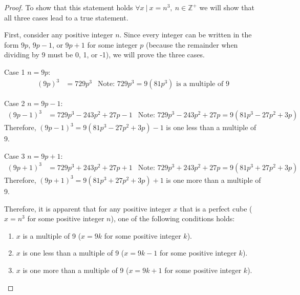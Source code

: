 \documentclass{report}
\begin{document}
\bigbreak \noindent 
\begin{proof}
    To show that this statement holds \(\forall x\ |\ x = n^{3},\ n \in \mathbb{Z}^{+}\) we will show that all three cases lead to a true statement. 
    \bigbreak \noindent 

    First, consider any positive integer \(n\). Since every integer can be written in the form \(9p\), \(9p-1\), or \(9p+1\) for some integer \(p\) (because the remainder when dividing by 9 must be 0, 1, or -1), we will prove the three cases.
    \bigbreak \noindent 

    Case 1 \(n=9p\):
    \begin{align*}
        (9p)^{3}  &= 729p^{3} & \text{Note: } 729p^3 = 9(81p^3) \text{ is a multiple of 9}
    \end{align*}
    \bigbreak \noindent 

    Case 2 \(n=9p-1\):
    \begin{align*}
        (9p-1)^{3}  &= 729p^{3}-243p^{2}+27p-1 & \text{Note: } 729p^3-243p^{2}+27p = 9(81p^3-27p^2+3p)
    \end{align*}
    Therefore, \((9p-1)^{3} = 9(81p^3-27p^2+3p)-1\) is one less than a multiple of 9.
    \bigbreak \noindent  

    Case 3 \(n=9p+1\):
    \begin{align*}
        (9p+1)^{3}  &= 729p^{3}+243p^{2}+27p+1 & \text{Note: } 729p^3+243p^{2}+27p = 9(81p^3+27p^2+3p)
    \end{align*}
    Therefore, \((9p+1)^{3} = 9(81p^3+27p^2+3p)+1\) is one more than a multiple of 9.
    \bigbreak \noindent 

    Therefore, it is apparent that for any positive integer \(x\) that is a perfect cube (\(x = n^3\) for some positive integer \(n\)), one of the following conditions holds:
    \begin{enumerate}
        \item \(x\) is a multiple of 9 (\(x = 9k\) for some positive integer \(k\)).
        \item \(x\) is one less than a multiple of 9 (\(x = 9k - 1\) for some positive integer \(k\)).
        \item \(x\) is one more than a multiple of 9 (\(x = 9k + 1\) for some positive integer \(k\)).
    \end{enumerate}
    \ep
\end{proof}

    \pagebreak \bigbreak \noindent    
\end{document}
